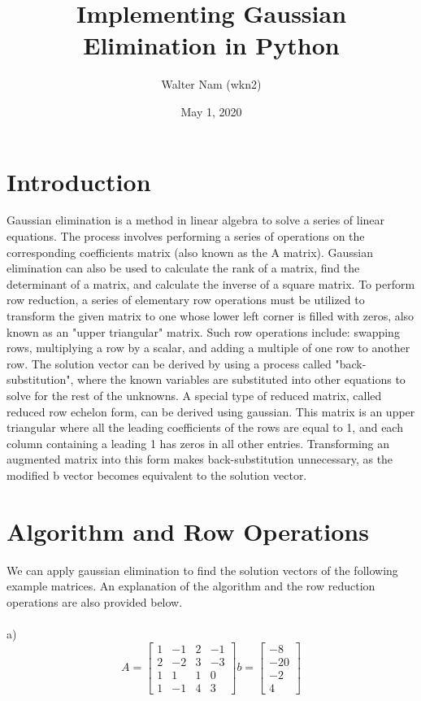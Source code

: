 \documentclass{article}
\begin{document}
           

    \title{Implementing Gaussian Elimination in Python}          
    \author{Walter Nam  (wkn2)}        
    \date{May 1, 2020}      

    \maketitle             

    \section{Introduction} 
    Gaussian elimination is a method in linear algebra to solve a series of linear equations. The process involves performing a series of operations on the corresponding coefficients matrix (also known as the A matrix). Gaussian elimination can also be used to calculate the rank of a matrix, find the determinant of a matrix, and calculate the inverse of a square matrix. To perform row reduction, a series of elementary row operations must be utilized to transform the given matrix to one whose lower left corner is filled with zeros, also known as an "upper triangular" matrix. Such row operations include: swapping rows, multiplying a row by a scalar, and adding a multiple of one row to another row. The solution vector can be derived by using a process called "back-substitution", where the known variables are substituted into other equations to solve for the rest of the unknowns. A special type of reduced matrix, called reduced row echelon form, can be derived using gaussian. This matrix is an upper triangular where all the leading coefficients of the rows are equal to 1, and each column containing a leading 1 has zeros in all other entries. Transforming an augmented matrix into this form makes back-substitution unnecessary, as the modified b vector becomes equivalent to the solution vector.  

    \section{Algorithm and Row Operations}  
    We can apply gaussian elimination to find the solution vectors of the following example matrices. An explanation of the algorithm and the row reduction operations are also provided below. 
    \\
    \\
       a) $$
        A =  \begin{bmatrix}1&-1&2&-1\\2&-2&3&-3\\1&1&1&0\\1&-1&4&3\end{bmatrix} 
b =   \begin{bmatrix}-8\\-20\\-2\\4\end{bmatrix} 
        $$
        
\end{document}
